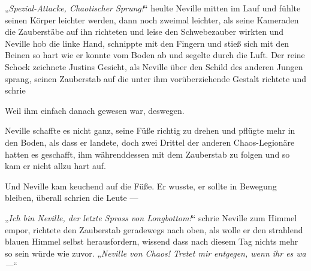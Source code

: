 „\emph{Spezial-Attacke, Chaotischer Sprung!}“ heulte Neville mitten im Lauf und fühlte seinen Körper leichter werden, dann noch zweimal leichter, als seine Kameraden die Zauberstäbe auf ihn richteten und leise den Schwebezauber wirkten und Neville hob die linke Hand, schnippte mit den Fingern und stieß sich mit den Beinen so hart wie er konnte vom Boden ab und segelte durch die Luft. Der reine Schock zeichnete Justins Gesicht, als Neville über den Schild des anderen Jungen sprang, seinen Zauberstab auf die unter ihm vorüberziehende Gestalt richtete und schrie 

Weil ihm einfach danach gewesen war, deswegen.

Neville schaffte es nicht ganz, seine Füße richtig zu drehen und pflügte mehr in den Boden, als dass er landete, doch zwei Drittel der anderen Chaos-Legionäre hatten es geschafft, ihm währenddessen mit dem Zauberstab zu folgen und so kam er nicht allzu hart auf.

Und Neville kam keuchend auf die Füße. Er wusste, er sollte in Bewegung bleiben, überall schrien die Leute  —

„\emph{Ich bin Neville, der letzte Spross von Longbottom!}“ schrie Neville zum Himmel empor, richtete den Zauberstab geradewegs nach oben, als wolle er den strahlend blauen Himmel selbst herausfordern, wissend dass nach diesem Tag nichts mehr so sein würde wie zuvor.
„\emph{Neville von Chaos! Tretet mir entgegen, wenn ihr es wa —}“

